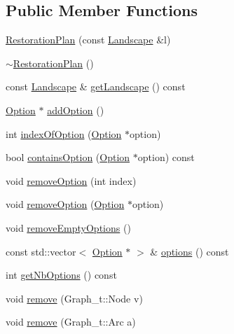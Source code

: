 \subsection*{Public Member Functions}
\begin{DoxyCompactItemize}
\item 
\hyperlink{class_restoration_plan_aef8ef06f5f745bbdd598c1df66c42ca8}{Restoration\+Plan} (const \hyperlink{class_landscape}{Landscape} \&l)
\item 
\hyperlink{class_restoration_plan_ac34ea5df284566db818bebf4de22c5e7}{$\sim$\+Restoration\+Plan} ()
\item 
const \hyperlink{class_landscape}{Landscape} \& \hyperlink{class_restoration_plan_a4bbbe2c593bd9d3de466cf3ea78bf310}{get\+Landscape} () const
\item 
\hyperlink{class_restoration_plan_1_1_option}{Option} $\ast$ \hyperlink{class_restoration_plan_a4f3ae1b64679d1b191077043c5cdedb7}{add\+Option} ()
\item 
int \hyperlink{class_restoration_plan_a7c8b52ba6e6a18b25cad055a6cd3086b}{index\+Of\+Option} (\hyperlink{class_restoration_plan_1_1_option}{Option} $\ast$option)
\item 
bool \hyperlink{class_restoration_plan_a9f076ad104176e469a5e1e8aecf72614}{contains\+Option} (\hyperlink{class_restoration_plan_1_1_option}{Option} $\ast$option) const
\item 
void \hyperlink{class_restoration_plan_a69958ecdd37533b64b601f6c2f190875}{remove\+Option} (int index)
\item 
void \hyperlink{class_restoration_plan_a7ea1f7c7dcee6357b0bd3a2d868a13b9}{remove\+Option} (\hyperlink{class_restoration_plan_1_1_option}{Option} $\ast$option)
\item 
void \hyperlink{class_restoration_plan_a8be9afd54fef1a4bcd2746c8d8dca3d9}{remove\+Empty\+Options} ()
\item 
const std\+::vector$<$ \hyperlink{class_restoration_plan_1_1_option}{Option} $\ast$ $>$ \& \hyperlink{class_restoration_plan_aeeca484cdb23f784a0a40256db6327a5}{options} () const
\item 
int \hyperlink{class_restoration_plan_a7c4e4b567a22267fb6a1c7eb8617c0fa}{get\+Nb\+Options} () const
\item 
void \hyperlink{class_restoration_plan_a59da0a26384e50e4615bcffa926b2d69}{remove} (Graph\+\_\+t\+::\+Node v)
\item 
void \hyperlink{class_restoration_plan_ae75f389f03e4fcb76b691ab383452142}{remove} (Graph\+\_\+t\+::\+Arc a)
\item 

\end{DoxyCompactItemize}
